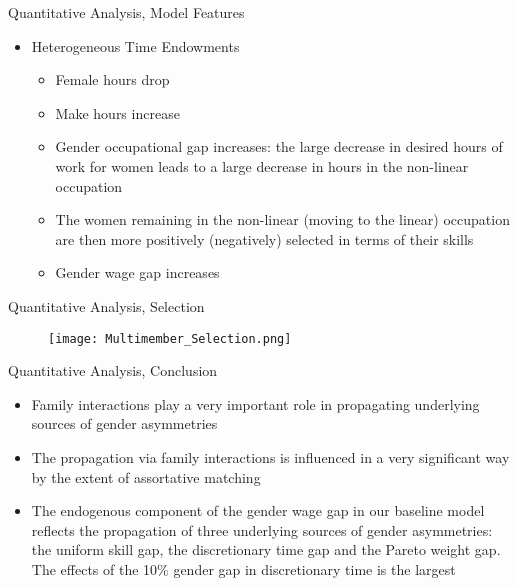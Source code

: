 \documentclass[hyperref={bookmarks=false}]{beamer}
\begin{document}
\begin{frame}{Quantitative Analysis, Model Features}
\begin{itemize}
\setlength{\itemsep}{0.25 cm}
\item Heterogeneous Time Endowments
\begin{itemize}
\item Female hours drop
\item Make hours increase
\item Gender occupational gap increases: the large decrease in desired hours of work for women leads to a large decrease in hours in the non-linear occupation
\item The women remaining in the non-linear (moving to the linear) occupation are then more positively (negatively) selected in terms of their skills
\item Gender wage gap increases
\end{itemize}
\end{itemize}
\end{frame}

\begin{frame}{Quantitative Analysis, Selection}
\begin{figure}[!t]
\centering
\begin{minipage}[b]{0.6\textwidth}{}
\centering
\texttt{[image: Multimember\_Selection.png]}
\end{minipage}
\end{figure}
\end{frame}

\begin{frame}{Quantitative Analysis, Conclusion}
\begin{itemize}
\setlength{\itemsep}{0.25 cm}
\item Family interactions play a very important role in propagating underlying sources of gender asymmetries
\item The propagation via family interactions is influenced in a very significant way by the extent of assortative matching
\item The endogenous component of the gender wage gap in our baseline model
reflects the propagation of three underlying sources of gender asymmetries: the uniform skill gap, the discretionary time gap and the Pareto weight gap. The
effects of the 10\% gender gap in discretionary time is the largest
\end{itemize}
\end{frame}

%
%
\end{document}
